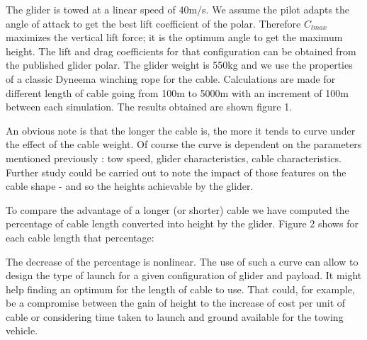 \documentclass[11pt]{amsart}
\begin{document}
The glider is towed at a linear speed of 40m/s. We assume the pilot adapts the angle of attack to get the best lift coefficient of the polar. Therefore $C_{lmax}$ maximizes the vertical lift force; it is the optimum angle to get the maximum height. The lift and drag coefficients for that configuration can be obtained from the published glider polar. The glider weight is 550kg and we use the properties of a classic Dyneema winching rope for the cable. Calculations are made for different length of cable going from 100m to 5000m with an increment of 100m between each simulation.
The results obtained are shown figure 1. 

An obvious note is that the longer the cable is, the more it tends to curve under the effect of the cable weight. Of course the curve is dependent on the parameters mentioned previously : tow speed, glider characteristics, cable characteristics. Further study could be carried out to note the impact of those features on the cable shape - and so the heights achievable by the glider. 

To compare the advantage of a longer (or shorter) cable we have computed the percentage of cable length converted into height by the glider. Figure 2 shows for each cable length that percentage: 


The decrease of the percentage is nonlinear. The use of such a curve can allow to design the type of launch for a given configuration of glider and payload. It might help finding an optimum for the length of cable to use. That could, for example, be a compromise between the gain of height to the increase of cost per unit of cable or considering time taken to launch and ground available for the towing vehicle. 
\end{document}
